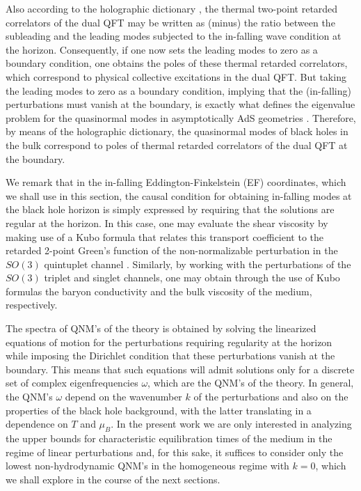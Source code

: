 \documentclass[aps,prd,showkeys,superscriptaddress,singlecolumn,nofootinbib,floatfix]{revtex4-1}
\begin{document}
Also according to the holographic dictionary \cite{Son:2002sd}, the thermal two-point retarded correlators of the dual QFT may be written as (minus) the ratio between the subleading and the leading modes subjected to the in-falling wave condition at the horizon. Consequently, if one now sets the leading modes to zero as a boundary condition, one obtains the poles of these thermal retarded correlators, which correspond to physical collective excitations in the dual QFT. But taking the leading modes to zero as a boundary condition, implying that the (in-falling) perturbations must vanish at the boundary, is exactly what defines the eigenvalue problem for the quasinormal modes in asymptotically AdS geometries \cite{Kovtun:2005ev}. Therefore, by means of the holographic dictionary, the quasinormal modes of black holes in the bulk correspond to poles of thermal retarded correlators of the dual QFT at the boundary.

We remark that in the in-falling Eddington-Finkelstein (EF) coordinates, which we shall use in this section, the causal condition for obtaining in-falling modes at the black hole horizon is simply expressed by requiring that the solutions are regular at the horizon. In this case, one may evaluate the shear viscosity by making use of a Kubo formula that relates this transport coefficient to the retarded 2-point Green's function of the non-normalizable perturbation in the $SO(3)$ quintuplet channel \cite{DeWolfe:2011ts}. Similarly, by working with the perturbations of the $SO(3)$ triplet and singlet channels, one may obtain through the use of Kubo formulas the baryon conductivity \cite{DeWolfe:2011ts,Rougemont:2015ona} and the bulk viscosity \cite{DeWolfe:2011ts,Rougemont:2017tlu} of the medium, respectively.

The spectra of QNM's of the theory is obtained by solving the linearized equations of motion for the perturbations requiring regularity at the horizon while imposing the Dirichlet condition that these perturbations vanish at the boundary. This means that such equations will admit solutions only for a discrete set of complex eigenfrequencies $\omega$, which are the QNM's of the theory. In general, the QNM's $\omega$ depend on the wavenumber $k$ of the perturbations and also on the properties of the black hole background, with the latter translating in a dependence on $T$ and $\mu_B$. In the present work we are only interested in analyzing the upper bounds for characteristic equilibration times of the medium in the regime of linear perturbations and, for this sake, it suffices to consider only the lowest non-hydrodynamic QNM's in the homogeneous regime with $k=0$, which we shall explore in the course of the next sections.
\end{document}
